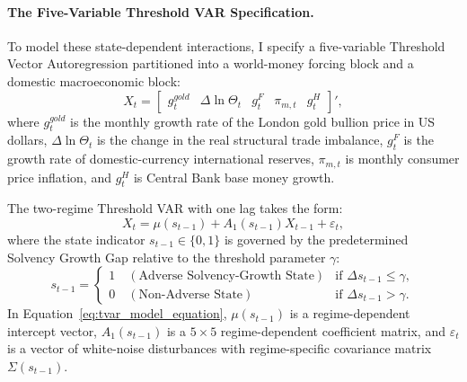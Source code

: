 \paragraph{The Five-Variable Threshold VAR Specification.}
To model these state-dependent interactions, I specify a five-variable Threshold Vector Autoregression partitioned into a world-money forcing block and a domestic macroeconomic block:
\begin{equation}
    X_t = \begin{bmatrix} g^{gold}_t & \Delta \ln \Theta_t & g^F_t & \pi_{m,t} & g^H_t \end{bmatrix}',
    \label{eq:tvar_variable_vector}
\end{equation}
where $g^{gold}_t$ is the monthly growth rate of the London gold bullion price in US dollars, $\Delta \ln \Theta_t$ is the change in the real structural trade imbalance, $g^F_t$ is the growth rate of domestic-currency international reserves, $\pi_{m,t}$ is monthly consumer price inflation, and $g^H_t$ is Central Bank base money growth. 

The two-regime Threshold VAR with one lag takes the form:
\begin{equation}
    X_t = \mu(s_{t-1}) + A_1(s_{t-1}) X_{t-1} + \varepsilon_t,
    \label{eq:tvar_model_equation}
\end{equation}
where the state indicator $s_{t-1} \in \{0, 1\}$ is governed by the predetermined Solvency Growth Gap relative to the threshold parameter $\gamma$:
\begin{equation}
    s_{t-1} = \begin{cases} 
        1 \quad (\text{Adverse Solvency-Growth State}) & \text{if } \Delta s_{t-1} \le \gamma, \\ 
        0 \quad (\text{Non-Adverse State}) & \text{if } \Delta s_{t-1} > \gamma.
    \end{cases}
    \label{eq:tvar_regime_indicator}
\end{equation}
In Equation~\eqref{eq:tvar_model_equation}, $\mu(s_{t-1})$ is a regime-dependent intercept vector, $A_1(s_{t-1})$ is a $5 \times 5$ regime-dependent coefficient matrix, and $\varepsilon_t$ is a vector of white-noise disturbances with regime-specific covariance matrix $\Sigma(s_{t-1})$.

